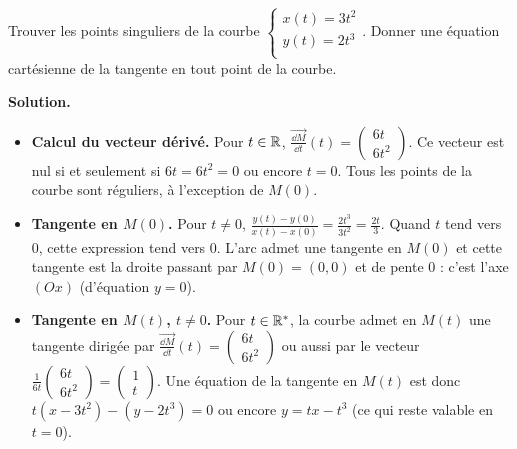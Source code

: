 \documentclass[class=report,crop=false]{standalone}
\begin{document}
\begin{exemple}
Trouver les points singuliers de la courbe
$\left\{
\begin{array}{l}
x(t)=3t^2\\
y(t)=2t^3\\
\end{array}\right.$.
Donner une équation cartésienne de la tangente en tout point de la courbe.

\medskip
\textbf{Solution.}

\begin{itemize}
  \item \textbf{Calcul du vecteur dérivé.}
  Pour $t\in\mathbb{R}$,
  $\overrightarrow{\frac{\dd M}{\dd t}}(t)=\left(\begin{smallmatrix}
6t\\6t^2\end{smallmatrix}\right)$.
Ce vecteur est nul si et seulement si $6t=6t^2=0$ ou encore $t=0$. Tous
les points de la courbe sont réguliers, à l'exception de $M(0)$.

  \item \textbf{Tangente en $M(0)$.}
  Pour $t\neq 0$,
$\frac{y(t)-y(0)}{x(t)-x(0)}=\frac{2t^3}{3t^2}=\frac{2t}{3}$.
Quand $t$ tend vers $0$, cette expression tend vers $0$. L'arc
admet une tangente en $M(0)$ et cette tangente est la droite
passant par $M(0)=(0,0)$ et de pente $0$ : c'est l'axe $(Ox)$ (d'équation $y=0$).


  \item \textbf{Tangente en $M(t)$, $t\neq0$.}
  Pour $t\in\mathbb{R}^*$, la courbe admet en $M(t)$ une tangente dirigée
  par $\overrightarrow{\frac{\dd M}{\dd t}}(t)
=\left(\begin{smallmatrix}6t\\6t^2\end{smallmatrix}\right)$
ou aussi par le vecteur
$\frac{1}{6t}\left(\begin{smallmatrix}
6t\\6t^2\end{smallmatrix}\right)
=\left(\begin{smallmatrix}1\\t\end{smallmatrix}\right)$.
Une équation de la tangente en $M(t)$ est donc $t(x-3t^2)-(y-2t^3)=0$
ou encore $y=tx-t^3$ (ce qui reste valable en $t=0$).


\end{itemize}


\end{exemple}
\end{document}
